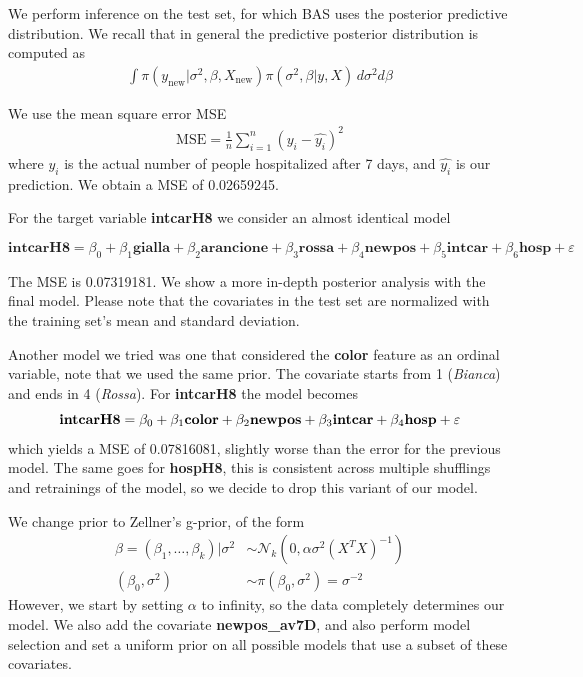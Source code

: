 \documentclass[12pt,a4paper]{article}
\theoremstyle{definition}
\theoremstyle{remark}
\begin{document}
We perform inference on the test set, for which BAS uses the posterior predictive distribution. We recall that in general the predictive posterior distribution is computed as 
	\begin{align*}
	\int \pi(y_{\text{new}}|\sigma^2,\beta,X_{\text{new}})\pi(\sigma^2,\beta|y,X)\,d\sigma^2d\beta
\end{align*}

We use the mean square error MSE
\begin{align*}
	\text{MSE} = \frac{1}{n}\sum_{i=1}^{n}(y_i-\hat{y_i})^2
\end{align*}
where $y_i$ is the actual number of people hospitalized after 7 days, and $\hat{y_i}$ is our prediction. We obtain a MSE of 0.02659245.

For the target variable \textbf{intcarH8} we consider an almost identical model

\begin{dmath*}
	\textbf{intcarH8} = \beta_0 + \beta_1\textbf{gialla} + \beta_2\textbf{arancione} + \beta_3\textbf{rossa} + \beta_4\textbf{newpos} + \beta_5\textbf{intcar} + \beta_6\textbf{hosp} + \varepsilon
\end{dmath*}

The MSE is 0.07319181. We show a more in-depth posterior analysis with the final model. Please note that the covariates in the test set are normalized with the training set's mean and standard deviation.

Another model we tried was one that considered the \textbf{color} feature as an ordinal variable, note that we used the same prior.  The covariate starts from 1 (\textit{Bianca}) and ends in 4 (\textit{Rossa}). For \textbf{intcarH8} the model becomes
\begin{dmath*}
	\textbf{intcarH8} = \beta_0 + \beta_1\textbf{color}  + \beta_2\textbf{newpos} + \beta_3\textbf{intcar} \\+ \beta_4\textbf{hosp}  + \varepsilon
\end{dmath*}
which yields a MSE of 0.07816081, slightly worse than the error for the previous model. The same goes for \textbf{hospH8}, this is consistent across multiple shufflings and retrainings of the model, so we decide to drop this variant of our model. 

We change prior to Zellner's g-prior, of the form
	\begin{align*}
	\beta = (\beta_1,\dots, \beta_k)|\sigma^2 &\sim \mathcal{N}_k(0, \alpha\sigma^2(X^TX)^{-1}) \\
	(\beta_0, \sigma^2) &\sim \pi(\beta_0, \sigma^2) = \sigma^{-2}
\end{align*}
However, we start by setting $\alpha$ to infinity, so the data completely determines our model. We also add the covariate \textbf{newpos\_av7D}, and also perform model selection and set a uniform prior on all possible models that use a subset of these covariates.
\end{document}
